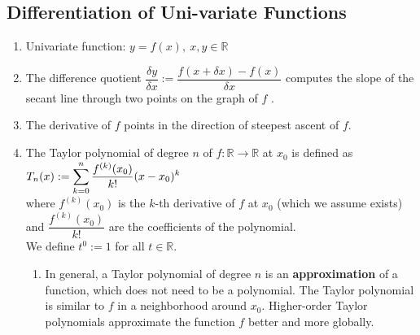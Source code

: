 \subsection{Differentiation of Uni-variate Functions}

\begin{enumerate}
    \item 
    \begin{definition}
        Univariate function: $y = f(x),\ x, y \in \mathbb{R}$
        \hfill \cite{mfml/book/mml/Deisenroth-Faisal-Ong}
    \end{definition}

    \item 
    \begin{definition}
        The difference quotient
        $
            \dfrac{\delta y}{\delta x} 
            := \dfrac{f(x + \delta x) - f(x)}{\delta x}
        $
        computes the slope of the secant line through two points on the graph of $f$ .
        \hfill \cite{mfml/book/mml/Deisenroth-Faisal-Ong}
    \end{definition}

    \item The derivative of $f$ points in the direction of steepest ascent of $f$. 
    \hfill \cite{mfml/book/mml/Deisenroth-Faisal-Ong}

    \item 
    \begin{definition}
        The Taylor polynomial of degree $n$ of $f : \mathbb{R} \to \mathbb{R}$ at $x_0$ is defined as
        $
            T_n(x)
            := \displaystyle\sum_{k=0}^n \dfrac{f^{(k)}(x_0)}{k!} (x - x_0)^k
        $
        \hfill \cite{mfml/book/mml/Deisenroth-Faisal-Ong}
        \\
        where $f ^{(k)}(x_0)$ is the $k$-th derivative of $f$ at $x_0$ (which we assume exists) and $\dfrac{f ^{(k)}(x_0)}{ k!}$ are the coefficients of the polynomial.
        \hfill \cite{mfml/book/mml/Deisenroth-Faisal-Ong}
        \\
        We define $t^0 := 1$ for all $t \in \mathbb{R}$.
        \hfill \cite{mfml/book/mml/Deisenroth-Faisal-Ong}
    \end{definition}
    \begin{enumerate}
        \item In general, a Taylor polynomial of degree $n$ is an \textbf{approximation} of a function, which does not need to be a polynomial. 
        The Taylor polynomial is similar to $f$ in a neighborhood around $x_0$. 
        Higher-order Taylor polynomials approximate the function $f$ better and more globally.
        \hfill \cite{mfml/book/mml/Deisenroth-Faisal-Ong}
        

\end{enumerate}
\end{enumerate}
